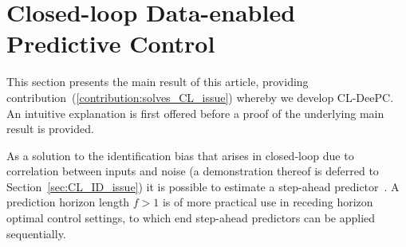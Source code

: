 \section{Closed-loop Data-enabled Predictive Control}
This section presents the main result of this article, providing contribution~(\ref{contribution:solves_CL_issue}) whereby we develop \ac{CL-DeePC}. An intuitive explanation is first offered before a proof of the underlying main result is provided.

As a solution to the identification bias that arises in closed-loop due to correlation between inputs and noise (a demonstration thereof is deferred to Section~\ref{sec:CL_ID_issue}) it is possible to estimate a step-ahead predictor~\citep{Ljung1996}. A prediction horizon length $f>1$ is of more practical use in receding horizon optimal control settings, to which end step-ahead predictors can be applied sequentially. 

